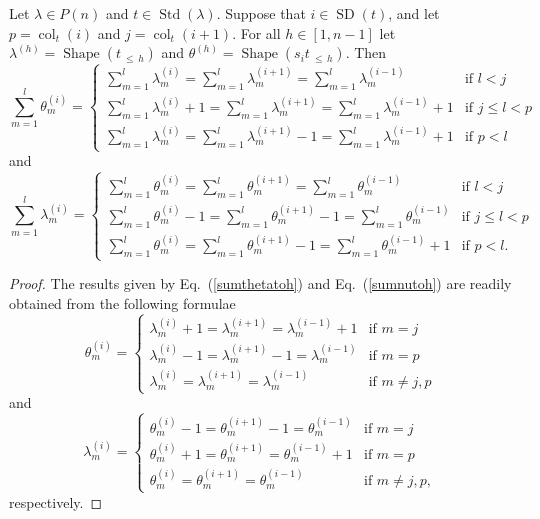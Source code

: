 \documentclass[ALCO,ThmDefs,Unicode,epreuves]{cedram}
\DeclareMathOperator{\col}{col}
\newcommand{\Lessthan}[2]{#1\,{_{\leqslant\,#2}}}
\DeclareMathOperator{\STD}{Std}
\DeclareMathOperator{\shape}{Shape}
\DeclareMathOperator{\SD}{SD}
\begin{document}
\begin{lemm}\label{shapetheta}
Let $\lambda\in P(n)$ and $t\in\STD(\lambda)$. Suppose that $i\in\SD(t)$,
and let $p=\col_t(i)$ and $j=\col_t(i+1)$. For all
$h\in[1,n-1]$ let $\lambda^{(h)}=\shape(\Lessthan th)$ and $\theta^{(h)}=\shape(\Lessthan{s_it}h)$.
Then
\begin{equation}\label{sumthetatoh}
\sum_{m=1}^l \theta^{(i)}_m =
\begin{cases}
\sum_{m=1}^l \lambda^{(i)}_m = \sum_{m=1}^l \lambda^{(i+1)}_m = \sum_{m=1}^l \lambda^{(i-1)}_m & \text{if $l<j$}\\
\sum_{m=1}^l \lambda^{(i)}_m + 1 = \sum_{m=1}^l \lambda^{(i+1)}_m = \sum_{m=1}^l \lambda^{(i-1)}_m + 1 & \text{if $j\leqslant l<p$}\\
\sum_{m=1}^l \lambda^{(i)}_m = \sum_{m=1}^l \lambda^{(i+1)}_m - 1= \sum_{m=1}^l \lambda^{(i-1)}_m + 1& \text{if $p<l$}
\end{cases}
\end{equation}
and
\begin{equation}\label{sumnutoh}
\sum_{m=1}^l \lambda^{(i)}_m =
\begin{cases}
\sum_{m=1}^l \theta^{(i)}_m = \sum_{m=1}^l \theta^{(i+1)}_m = \sum_{m=1}^l \theta^{(i-1)}_m & \text{if $l<j$}\\
\sum_{m=1}^l \theta^{(i)}_m - 1 = \sum_{m=1}^l \theta^{(i+1)}_m - 1= \sum_{m=1}^l \theta^{(i-1)}_m & \text{if $j\leqslant l<p$}\\
\sum_{m=1}^l \theta^{(i)}_m = \sum_{m=1}^l \theta^{(i+1)}_m - 1= \sum_{m=1}^l \theta^{(i-1)}_m + 1& \text{if $p<l$}.
\end{cases}
\end{equation}
\end{lemm}
\begin{proof}
The results given by Eq.~(\ref{sumthetatoh}) and Eq.~(\ref{sumnutoh}) are readily obtained from the following formulae
\begin{equation}\label{thetam}
\theta^{(i)}_m =
\begin{cases}
\lambda^{(i)}_m + 1 = \lambda^{(i+1)}_{m} = \lambda^{(i-1)}_m + 1 & \text{if $m=j$}\\
\lambda^{(i)}_m - 1 = \lambda^{(i+1)}_{m} - 1 = \lambda^{(i-1)}_m & \text{if $m=p$}\\
\lambda^{(i)}_m = \lambda^{(i+1)}_{m} = \lambda^{(i-1)}_m & \text{if $m\neq j,p$}
\end{cases}
\end{equation}
and
\begin{equation}\label{num}
\lambda^{(i)}_m =
\begin{cases}
\theta^{(i)}_m - 1 = \theta^{(i+1)}_{m} - 1 = \theta^{(i-1)}_m & \text{if $m=j$}\\
\theta^{(i)}_m + 1 = \theta^{(i+1)}_{m} = \theta^{(i-1)}_m + 1 & \text{if $m=p$}\\
\theta^{(i)}_m = \theta^{(i+1)}_{m} = \theta^{(i-1)}_m & \text{if $m\neq j,p$},
\end{cases}
\end{equation}
respectively.
\end{proof}
\end{document}
